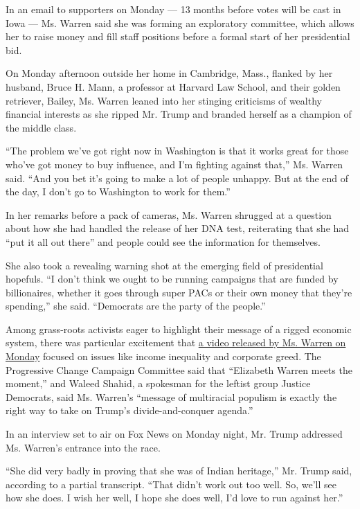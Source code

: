 In an email to supporters on Monday --- 13 months before votes will be
cast in Iowa --- Ms. Warren said she was forming an exploratory
committee, which allows her to raise money and fill staff positions
before a formal start of her presidential bid.

On Monday afternoon outside her home in Cambridge, Mass., flanked by her
husband, Bruce H. Mann, a professor at Harvard Law School, and their
golden retriever, Bailey, Ms. Warren leaned into her stinging criticisms
of wealthy financial interests as she ripped Mr. Trump and branded
herself as a champion of the middle class.

``The problem we've got right now in Washington is that it works great
for those who've got money to buy influence, and I'm fighting against
that,'' Ms. Warren said. ``And you bet it's going to make a lot of
people unhappy. But at the end of the day, I don't go to Washington to
work for them.''

In her remarks before a pack of cameras, Ms. Warren shrugged at a
question about how she had handled the release of her DNA test,
reiterating that she had ``put it all out there'' and people could see
the information for themselves.

She also took a revealing warning shot at the emerging field of
presidential hopefuls. ``I don't think we ought to be running campaigns
that are funded by billionaires, whether it goes through super PACs or
their own money that they're spending,'' she said. ``Democrats are the
party of the people.''

Among grass-roots activists eager to highlight their message of a rigged
economic system, there was particular excitement that
\href{https://www.youtube.com/watch?v=rbH0RU4GcVo}{a video released by
Ms. Warren on Monday} focused on issues like income inequality and
corporate greed. The Progressive Change Campaign Committee said that
``Elizabeth Warren meets the moment,'' and Waleed Shahid, a spokesman
for the leftist group Justice Democrats, said Ms. Warren's ``message of
multiracial populism is exactly the right way to take on Trump's
divide-and-conquer agenda.''

In an interview set to air on Fox News on Monday night, Mr. Trump
addressed Ms. Warren's entrance into the race.

``She did very badly in proving that she was of Indian heritage,'' Mr.
Trump said, according to a partial transcript. ``That didn't work out
too well. So, we'll see how she does. I wish her well, I hope she does
well, I'd love to run against her.''

